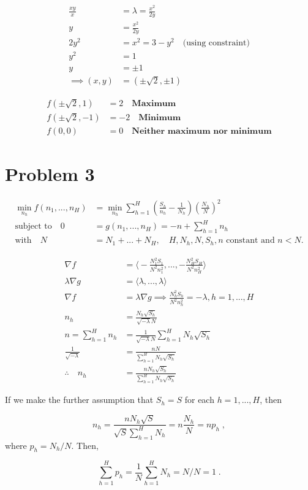 \documentclass[a4paper]{article}
\begin{document}
\begin{align*}
\frac{xy}{x} &= \lambda = \frac{x^2}{2y} \\
y &= \frac{x^2}{2y} \\
2y^2 &= x^2 = 3-y^2 \quad \text{(using constraint)} \\
y^2 &= 1\\
y &= \pm 1 \\
\implies (x,y) &= (\pm \sqrt{2}, \pm 1)
\end{align*}

\begin{align*}
f(\pm \sqrt{2}, 1) &= 2 \quad \textbf{Maximum} \\
f(\pm \sqrt{2}, -1) &= -2 \quad \textbf{Minimum} \\
f(0,0) &= 0 \quad \textbf{Neither maximum nor minimum}
\end{align*}

\section*{Problem 3}

\begin{align*}
\min_{n_h} f(n_1, ... , n_H) &= \min_{n_h} \sum_{h=1}^H \left(\frac{S_h}{n_h} - \frac{1}{N_h}\right)\left(\frac{N_h}{N}\right)^2 \\
\text{subject to}\quad 0 &= g(n_1,...,n_H) = -n + \sum_{h=1}^H n_h \\
\text{with} \quad N&= N_1 + ... + N_H, \quad H,N_h,N,S_h,n \text{ constant and } n < N .
\end{align*}

\begin{align*}
\nabla f &= \bigg\langle -\frac{N_1^2S_1}{N^2n_1^2}, ..., -\frac{N_H^2S_H}{N^2n_H^2} \bigg\rangle \\
\lambda \nabla g &= \langle \lambda, ... , \lambda \rangle \\
\nabla f &= \lambda \nabla g  \implies \frac{N_h^2S_h}{N^2n_h^2} = -\lambda, h = 1,...,H\\
n_h &= \frac{N_h\sqrt{S_h}}{\sqrt{-\lambda}N} \\
n = \sum_{h=1}^H n_h &= \frac{1}{\sqrt{-\lambda}N}\sum_{h=1}^H N_h\sqrt{S_h} \\
\frac{1}{\sqrt{-\lambda}} &= \frac{nN}{\sum_{h=1}^H N_h \sqrt{S_h}} \\
\therefore \quad n_h &= \frac{nN_h\sqrt{S_h}}{\sum_{h=1}^H N_h\sqrt{S_h}}
\end{align*}

If we make the further assumption that $S_h = S$ for each $h = 1,...,H$, then 

$$n_h = \frac{nN_h\sqrt{S}}{\sqrt{S}\sum_{h=1}^H N_h} = n\frac{N_h}{N} = np_h \;,$$
where $p_h = N_h / N$. Then,

$$\sum_{h=1}^H p_h = \frac{1}{N}\sum_{h=1}^H N_h = N/N =1 \;.$$
\end{document}
